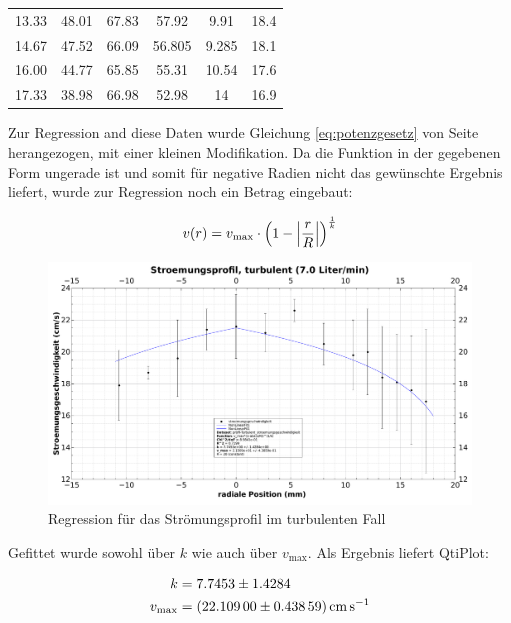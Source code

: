 \begin{table}[h!t]
\begin{tabular}{SSSSSS}
        13.33
        & 48.01
        & 67.83
        & 57.92
        & 9.91
        & 18.4 
        \\

        14.67
        & 47.52
        & 66.09
        & 56.805
        & 9.285
        & 18.1 
        \\

        16.00
        & 44.77
        & 65.85
        & 55.31
        & 10.54
        & 17.6 
        \\

        17.33
        & 38.98
        & 66.98
        & 52.98
        & 14
        & 16.9 
        \\

        \bottomrule
    \end{tabular}
\end{table}

Zur Regression and diese Daten wurde Gleichung \ref{eq:potenzgesetz} von Seite
\pageref{eq:potenzgesetz} herangezogen, mit einer kleinen Modifikation. Da die
Funktion in  der gegebenen Form ungerade  ist und somit f\"ur  negative Radien
nicht das gew\"unschte Ergebnis liefert,  wurde zur Regression noch ein Betrag
eingebaut:

\begin{equation}
    \label{eq:potenzgesetz:abs}
    v(r) = v_{\mathrm{max}} \cdot \left( 1 - \abs*{\frac{r}{R}} \right)^{\frac{1}{k}}
\end{equation}

\begin{figure}[h!t]
    \centering
    \includegraphics[width=\textwidth]{images/profil-turbulent.pdf}
    \caption{Regression f\"ur das Str\"omungsprofil im turbulenten Fall}
    \label{fig:profile:turb}
\end{figure}

Gefittet wurde sowohl \"uber $k$ wie auch \"uber $v_{\mathrm{max}}$. Als Ergebnis
liefert QtiPlot:

\begin{align}
    \label{eq:profile:turb:regression:results:k}
    k &= 7.7453 \pm 1.4284
    \\
    \label{eq:profile:turb:regression:results:vmax}
    v_{\mathrm{max}} &= \SI{22.109 \pm 0.43859}{\centi\meter\per\second}
\end{align}
